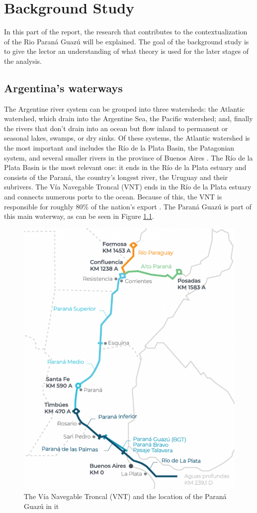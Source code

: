 \chapter{Background Study}
\label{chapter:background}
In this part of the report, the research that contributes to the contextualization of the Rio Paraná Guazú will be explained. The goal of the background study is to give the lector an understanding of what theory is used for the later stages of the analysis.

\section{Argentina's waterways}
The Argentine river system can be grouped into three watersheds: the Atlantic watershed, which drain into the Argentine Sea, the Pacific watershed; and, finally the rivers that don't drain into an ocean but flow inland to permanent or seasonal lakes, swamps, or dry sinks. Of these systems, the Atlantic watershed is the most important and includes the Río de la Plata Basin, the Patagonian system, and several smaller rivers in the province of Buenos Aires \autocite{marioe.farberHydrographyArgentina2024}. The Río de la Plata Basin is the most relevant one: it ends in the Río de la Plata estuary and consists of the Paraná, the country's longest river, the Uruguay and their subrivers. The Vía Navegable Troncal (VNT) ends in the Río de la Plata estuary and connects numerous ports to the ocean. Because of this, the VNT is responsible for roughly 80\% of the nation's export \autocite{NavegableTroncal2025}. The Paraná Guazú is part of this main waterway, as can be seen in Figure \ref{fig:VNT}.

\begin{figure}[H]
    \centering
    \includegraphics[width=0.5\linewidth]{figures/ch2/2025_mapa_vnt_extendida_tramos_profundidades_abril.png}
    \caption{The Vía Navegable Troncal (VNT) and the location of the Paraná Guazú in it \autocite{NavegableTroncal2025}}
    \label{fig:VNT}
\end{figure}

